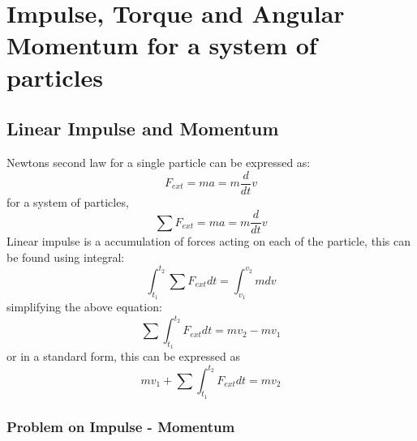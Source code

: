 \chapter{Impulse, Torque and Angular Momentum for a system of particles}

\section{Linear Impulse and Momentum}

Newtons second law for a single particle can be expressed as:
\begin{equation}
	F_{ext} = m a = m \frac{d}{dt}v
\end{equation}
for a system of particles,
\begin{equation}
\sum F_{ext} = m a = m \frac{d}{dt}v
\end{equation}
Linear impulse is a accumulation of forces acting on each of the particle, this can be found using integral:
\begin{equation}
\int_{t_{1}}^{t_{2}} \sum F_{ext} dt = \int_{v_{1}}^{v_{2}} m dv
\end{equation}
simplifying the above equation:
\begin{equation}
 \sum \int_{t_{1}}^{t_{2}} F_{ext} dt = m v_{2} - m v_{1}
\end{equation}
or in a standard form, this can be expressed as
\begin{equation}\label{Eq_0_ch2_ImpulseMometumEquation}
m v_{1} + \sum \int_{t_{1}}^{t_{2}} F_{ext} dt = m v_{2}
\end{equation}

\subsection{Problem on Impulse - Momentum}

